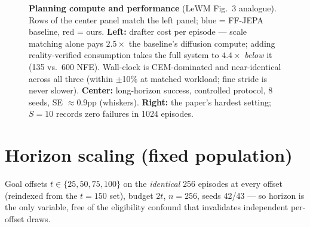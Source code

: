 \documentclass[11pt]{article}
\newcommand{\degc}[1]{$#1^\circ$}
\begin{document}
\begin{figure}[h]
\caption{\textbf{Planning compute and performance} (LeWM Fig.~3 analogue). Rows of
the center panel match the left panel; blue = FF-JEPA baseline, red = ours.
\textbf{Left:} drafter cost per episode --- scale matching alone pays $2.5\times$
the baseline's diffusion compute; adding reality-verified consumption takes the
full system to $4.4\times$ \emph{below} it (135 vs.\ 600 NFE). Wall-clock is
CEM-dominated and near-identical across all three (within $\pm$10\% at matched
workload; fine stride is never slower). \textbf{Center:} long-horizon success,
controlled protocol, 8 seeds, SE $\approx 0.9$pp (whiskers). \textbf{Right:} the
paper's hardest setting; $S{=}10$ records zero failures in 1024 episodes.}
\label{fig:compute-sr}
\end{figure}

\section{Horizon scaling (fixed population)}

Goal offsets $t \in \{25,50,75,100\}$ on the \emph{identical}
256 episodes at every offset (reindexed from the $t{=}150$ set), budget $2t$,
$n{=}256$, seeds 42/43 --- so horizon is the only variable, free of the eligibility
confound that invalidates independent per-offset draws.
\end{document}
